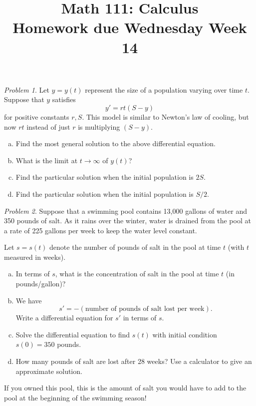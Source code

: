 \documentclass[11pt,twoside]{amsart}
\title{Math 111: Calculus\\ Homework due Wednesday Week 14}
\theoremstyle{plain}
\theoremstyle{remark}
\newtheorem{prob}{Problem}
\theoremstyle{definition}
\theoremstyle{definition}
\begin{document}
\maketitle

\begin{prob}
Let $y = y(t)$ represent the size of a population varying over time $t$. Suppose that $y$ satisfies
\[
  y' = rt(S-y)
\]
for positive constants $r,S$. This model is similar to Newton's law of cooling, but now $rt$ instead of just $r$ is multiplying $(S-y)$.
\begin{enumerate}[(a)]
\item Find the most general solution to the above differential equation.
\item What is the limit at $t\to \infty$ of $y(t)$?
\item Find the particular solution when the initial population is $2S$.
\item Find the particular solution when the initial population is $S/2$.
\end{enumerate}
\end{prob}

\begin{prob}
Suppose that a swimming pool contains 13,000 gallons of water and 350 pounds of salt. As it rains over the winter, water is drained from the pool at a rate of 225 gallons per week to keep the water level constant.

Let $s = s(t)$ denote the number of pounds of salt in the pool at time $t$ (with $t$ measured in weeks).

\begin{enumerate}[(a)]
\item In terms of $s$, what is the concentration of salt in the pool at time $t$ (in pounds/gallon)?
\item We have
\[
  s' = -(\text{number of pounds of salt lost per week}).
\]
Write a differential equation for $s'$ in terms of $s$.
\item Solve the differential equation to find $s(t)$ with initial condition $s(0) = 350$ pounds.
\item How many pounds of salt are lost after 28 weeks? Use a calculator to give an approximate solution.
\end{enumerate}

If you owned this pool, this is the amount of salt you would have to add to the pool at the beginning of the swimming season!
\end{prob}
\end{document}
